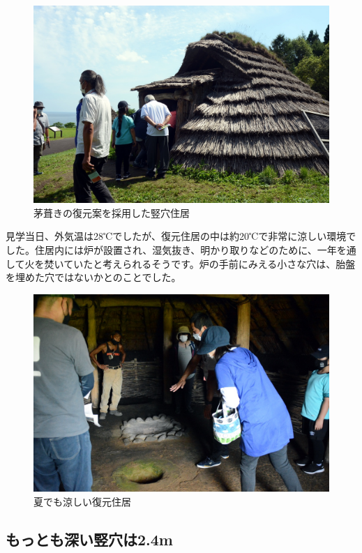 \documentclass[a4j,11pt,twocolumn,openany]{jsbook}
\begin{document}
\begin{figure}[ht]
	\centering
	\includegraphics[width=\linewidth]{fig/01_Iseki_kengaku/06_Ofune_house.JPG}
	\caption{茅葺きの復元案を採用した竪穴住居}
	\label{}
\end{figure}

見学当日、外気温は28℃でしたが、復元住居の中は約20℃で非常に涼しい環境でした。住居内には炉が設置され、湿気抜き、明かり取りなどのために、一年を通して火を焚いていたと考えられるそうです。炉の手前にみえる小さな穴は、胎盤を埋めた穴ではないかとのことでした。

\begin{figure}[ht]
	\centering
	\includegraphics[width=\linewidth]{fig/01_Iseki_kengaku/07Ofune_inner_house.JPG}
	\caption{夏でも涼しい復元住居}
	\label{}
\end{figure}

\subsection{もっとも深い竪穴は2.4m}
\end{document}
